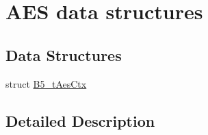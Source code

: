 \hypertarget{group__aes_str}{\section{A\-E\-S data structures}
\label{group__aes_str}
}
\subsection*{Data Structures}
\begin{DoxyCompactItemize}
\item 
struct \hyperlink{struct_b5__t_aes_ctx}{B5\-\_\-t\-Aes\-Ctx}
\end{DoxyCompactItemize}


\subsection{Detailed Description}
